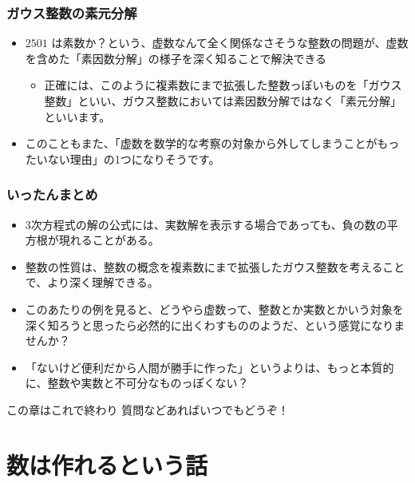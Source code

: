 \documentclass[dvipdfmx]{beamer}
\begin{document}
  \begin{frame}
    \frametitle{ガウス整数の素元分解}

    \begin{itemize}
      \item $2501$ は素数か？という、虚数なんて全く関係なさそうな整数の問題が、虚数を含めた「素因数分解」の様子を深く知ることで解決できる
      \begin{itemize}
        \item 正確には、このように複素数にまで拡張した整数っぽいものを「ガウス整数」といい、ガウス整数においては素因数分解ではなく「素元分解」といいます。
      \end{itemize}
      \item このこともまた、「虚数を数学的な考察の対象から外してしまうことがもったいない理由」の1つになりそうです。
    \end{itemize}

  \end{frame}

  \begin{frame}
    \frametitle{いったんまとめ}

    \begin{itemize}
      \item 3次方程式の解の公式には、実数解を表示する場合であっても、負の数の平方根が現れることがある。
      \item 整数の性質は、整数の概念を複素数にまで拡張したガウス整数を考えることで、より深く理解できる。

      \pause

      \item このあたりの例を見ると、どうやら虚数って、整数とか実数とかいう対象を深く知ろうと思ったら必然的に出くわすもののようだ、という感覚になりませんか？
      \item 「ないけど便利だから人間が勝手に作った」というよりは、もっと本質的に、整数や実数と不可分なものっぽくない？
    \end{itemize}

    \begin{block}{この章はこれで終わり}
      質問などあればいつでもどうぞ！
    \end{block}

  \end{frame}

  \section{数は作れるという話}
\end{document}
